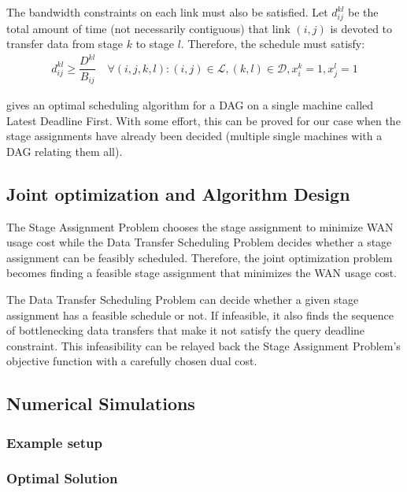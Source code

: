 The bandwidth constraints on each link must also be satisfied.
Let $d_{ij}^{kl}$ be the total amount of time (not necessarily contiguous) that link $(i,j)$ is devoted to transfer data from stage $k$ to stage $l$.
Therefore, the schedule must satisfy:
\begin{align}
	d_{ij}^{kl} \geq \dfrac{D^{kl}}{B_{ij}} \quad \forall (i,j,k,l): (i,j)\in\mathcal{L},(k,l)\in\mathcal{D},x_i^k=1,x_j^l=1
\end{align}

\begin{conjecture}
	\cite{lawler1973optimal} gives an optimal scheduling algorithm for a DAG on a single machine called Latest Deadline First.
	With some effort, this can be proved for our case when the stage assignments have already been decided (multiple single machines with a DAG relating them all). 
\end{conjecture}


\subsection{Joint optimization and Algorithm Design}

The Stage Assignment Problem chooses the stage assignment to minimize WAN usage cost while the Data Transfer Scheduling Problem decides whether a stage assignment can be feasibly scheduled.
Therefore, the joint optimization problem becomes finding a feasible stage assignment that minimizes the WAN usage cost.

\begin{conjecture}
	The Data Transfer Scheduling Problem can decide whether a given stage assignment has a feasible schedule or not.
	If infeasible, it also finds the sequence of bottlenecking data transfers that make it not satisfy the query deadline constraint.
	This infeasibility can be relayed back the Stage Assignment Problem's objective function with a carefully chosen dual cost.
\end{conjecture}



\subsection{Numerical Simulations}

\subsubsection{Example setup}


\subsubsection{Optimal Solution}

